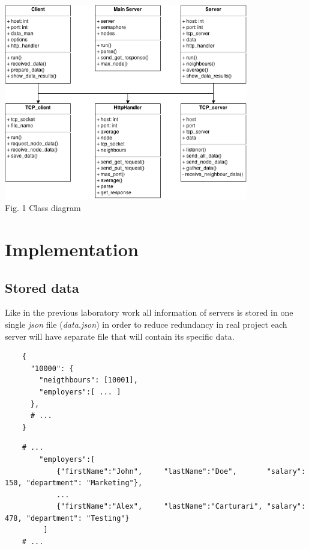 \documentclass[12pt]{article}
\begin{document}
    \begin{minipage}[b]{1.0\linewidth}
      \begin{center}
        \includegraphics[width=0.8\textwidth]{diagram}
         \\ Fig. 1 Class diagram
      \end{center}
    \end{minipage}
    
  \section{Implementation}

    \subsection{Stored data}

    Like in the previous laboratory work all information of servers is stored in one single \textit{json} file (\textit{data.json}) 
    in order to reduce redundancy in real project each server will have separate file that will contain its specific data. 
    
    \begin{lstlisting}
    {
      "10000": {
        "neigthbours": [10001],
        "employers":[ ... ]
      },
      # ... 
    }
    \end{lstlisting}

    \begin{lstlisting}
    # ...
        "employers":[
            {"firstName":"John",     "lastName":"Doe",       "salary": 150, "department": "Marketing"},
            ...
            {"firstName":"Alex",     "lastName":"Carturari", "salary": 478, "department": "Testing"}
         ]
    # ...
    \end{lstlisting}
\end{document}
